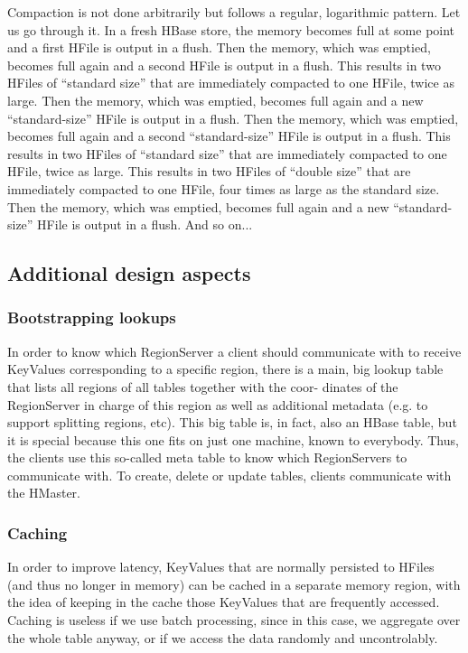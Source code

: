 Compaction is not done arbitrarily but follows a regular, logarithmic pattern. Let us go through it. In a fresh HBase store, the memory becomes full at some point and a first HFile is output in a flush. Then the memory, which was emptied, becomes full again and a second HFile is output in a flush. This results in two HFiles of “standard size” that are immediately compacted to one HFile, twice as large. Then the memory, which was emptied, becomes full again and a new “standard-size” HFile is output in a flush. Then the memory, which was emptied, becomes full again and a second “standard-size” HFile is output in a flush. This results in two HFiles of “standard size” that are immediately compacted to one HFile, twice as large. This results in two HFiles of “double size” that are immediately compacted to one HFile, four times as large as the standard size. Then the memory, which was emptied, becomes full again and a new “standard-size” HFile is output in a flush. And so on...

\subsection{Additional design aspects}

\subsubsection{Bootstrapping lookups}
In order to know which RegionServer a client should communicate with to receive KeyValues corresponding to a specific region, there is a main, big lookup table that lists all regions of all tables together with the coor- dinates of the RegionServer in charge of this region as well as additional metadata (e.g. to support splitting regions, etc).
This big table is, in fact, also an HBase table, but it is special because this one fits on just one machine, known to everybody. Thus, the clients use this so-called meta table to know which RegionServers to communicate with.
To create, delete or update tables, clients communicate with the HMaster.

\subsubsection{Caching}
In order to improve latency, KeyValues that are normally persisted to HFiles (and thus no longer in memory) can be cached in a separate memory region, with the idea of keeping in the cache those KeyValues that are frequently accessed.
Caching is useless if we use batch processing, since in this case, we aggregate over the whole table anyway, or if we access the data randomly and uncontrolably.

